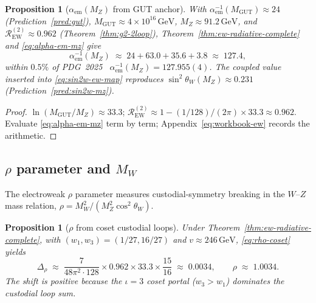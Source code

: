 \documentclass[aps,prd,onecolumn,amsmath,amssymb,nofootinbib,11pt]{revtex4-2}
\numberwithin{equation}{section}
\theoremstyle{plain}
\newtheorem{proposition}[theorem]{Proposition}
\theoremstyle{definition}
\theoremstyle{remark}
\begin{document}
\begin{proposition}[$\alpha_{\mathrm{em}}(M_Z)$ from GUT anchor]
\label{prop:alpha-em-mz}
With $\alpha_{\mathrm{em}}^{-1}(M_{\mathrm{GUT}})\approx24$
(Prediction~\ref{pred:gut}), $M_{\mathrm{GUT}}\approx4\times10^{16}\,\mathrm{GeV}$,
$M_Z\approx91.2\,\mathrm{GeV}$, and $\mathcal{R}_{\mathrm{EW}}^{(2)}\approx0.962$
(Theorem~\ref{thm:g2-2loop}), Theorem~\ref{thm:ew-radiative-complete} and
\eqref{eq:alpha-em-mz} give
\begin{equation}\label{eq:alpha-em-numeric}
  \alpha_{\mathrm{em}}^{-1}(M_Z)
  \;\approx\;
  24 + 63.0 + 35.6 + 3.8
  \;\approx\;
  127.4,
\end{equation}
within $0.5\%$ of PDG~2025~\cite{PDG2025}
$\alpha_{\mathrm{em}}^{-1}(M_Z)=127.955(4)$. The coupled value inserted into
\eqref{eq:sin2w-ew-map} reproduces $\sin^2\theta_W(M_Z)\approx0.231$
(Prediction~\ref{pred:sin2w-mz}).
\end{proposition}

\begin{proof}
$\ln(M_{\mathrm{GUT}}/M_Z)\approx33.3$;
$\mathcal{R}_{\mathrm{EW}}^{(2)}\approx1-(1/128)/(2\pi)\times33.3\approx0.962$.
Evaluate \eqref{eq:alpha-em-mz} term by term; Appendix~\eqref{eq:workbook-ew}
records the arithmetic.
\end{proof}

\subsection{\texorpdfstring{$\rho$}{rho} parameter and \texorpdfstring{$M_W$}{MW}}
\label{sec:ew-precision:rho-mw}

The electroweak $\rho$ parameter measures custodial-symmetry breaking in the
$W$--$Z$ mass relation,
$\rho=M_W^2/(M_Z^2\cos^2\theta_W)$.

\begin{proposition}[$\rho$ from coset custodial loops]
\label{prop:rho-parameter}
Under Theorem~\ref{thm:ew-radiative-complete}, with
$(w_1,w_3)=(1/27,16/27)$ and $v\approx246\,\mathrm{GeV}$,
\eqref{eq:rho-coset} yields
\begin{equation}\label{eq:rho-numeric}
  \Delta_\rho
  \;\approx\;
  \frac{7}{48\pi^2\cdot 128}\times 0.962\times 33.3\times\frac{15}{16}
  \;\approx\;
  0.0034,
  \qquad
  \rho \;\approx\; 1.0034.
\end{equation}
The shift is positive because the $\iota=3$ coset portal
($w_3>w_1$) dominates the custodial loop sum.
\end{proposition}
\end{document}
